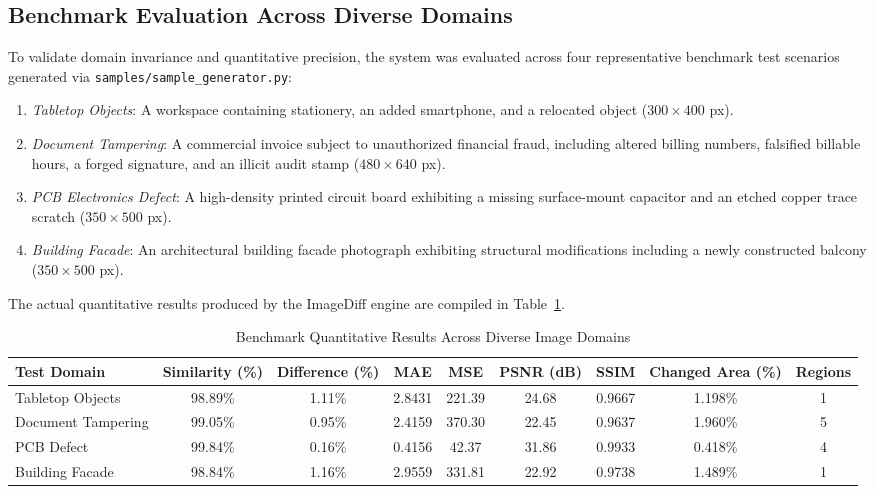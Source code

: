 \documentclass[conference]{IEEEtran}
\begin{document}
\subsection{Benchmark Evaluation Across Diverse Domains}
To validate domain invariance and quantitative precision, the system was evaluated across four representative benchmark test scenarios generated via \texttt{samples/sample\_generator.py}:
\begin{enumerate}
    \item \textit{Tabletop Objects}: A workspace containing stationery, an added smartphone, and a relocated object ($300 \times 400$ px).
    \item \textit{Document Tampering}: A commercial invoice subject to unauthorized financial fraud, including altered billing numbers, falsified billable hours, a forged signature, and an illicit audit stamp ($480 \times 640$ px).
    \item \textit{PCB Electronics Defect}: A high-density printed circuit board exhibiting a missing surface-mount capacitor and an etched copper trace scratch ($350 \times 500$ px).
    \item \textit{Building Facade}: An architectural building facade photograph exhibiting structural modifications including a newly constructed balcony ($350 \times 500$ px).
\end{enumerate}

The actual quantitative results produced by the ImageDiff engine are compiled in Table~\ref{tab_benchmarks}.

\begin{table}[htbp]
\caption{Benchmark Quantitative Results Across Diverse Image Domains}
\begin{center}
\begin{tabular}{lcccccccc}
\toprule
\textbf{Test Domain} & \textbf{Similarity (\%)} & \textbf{Difference (\%)} & \textbf{MAE} & \textbf{MSE} & \textbf{PSNR (dB)} & \textbf{SSIM} & \textbf{Changed Area (\%)} & \textbf{Regions} \\
\midrule
Tabletop Objects     & 98.89\% & 1.11\% & 2.8431 & 221.39 & 24.68 & 0.9667 & 1.198\% & 1 \\
Document Tampering   & 99.05\% & 0.95\% & 2.4159 & 370.30 & 22.45 & 0.9637 & 1.960\% & 5 \\
PCB Defect           & 99.84\% & 0.16\% & 0.4156 &  42.37 & 31.86 & 0.9933 & 0.418\% & 4 \\
Building Facade      & 98.84\% & 1.16\% & 2.9559 & 331.81 & 22.92 & 0.9738 & 1.489\% & 1 \\
\bottomrule
\end{tabular}
\label{tab_benchmarks}
\end{center}
\end{table}
\end{document}
